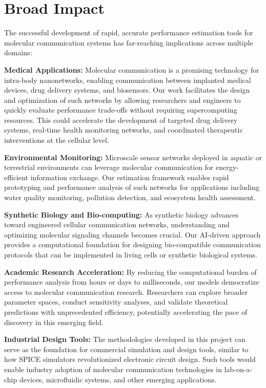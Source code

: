 \documentclass[a4paper,12pt]{report}
\begin{document}
\section{Broad Impact}

The successful development of rapid, accurate performance estimation tools for molecular communication systems has far-reaching implications across multiple domains:

\textbf{Medical Applications:} Molecular communication is a promising technology for intra-body nanonetworks, enabling communication between implanted medical devices, drug delivery systems, and biosensors. Our work facilitates the design and optimization of such networks by allowing researchers and engineers to quickly evaluate performance trade-offs without requiring supercomputing resources. This could accelerate the development of targeted drug delivery systems, real-time health monitoring networks, and coordinated therapeutic interventions at the cellular level.

\textbf{Environmental Monitoring:} Microscale sensor networks deployed in aquatic or terrestrial environments can leverage molecular communication for energy-efficient information exchange. Our estimation framework enables rapid prototyping and performance analysis of such networks for applications including water quality monitoring, pollution detection, and ecosystem health assessment.

\textbf{Synthetic Biology and Bio-computing:} As synthetic biology advances toward engineered cellular communication networks, understanding and optimizing molecular signaling channels becomes crucial. Our AI-driven approach provides a computational foundation for designing bio-compatible communication protocols that can be implemented in living cells or synthetic biological systems.

\textbf{Academic Research Acceleration:} By reducing the computational burden of performance analysis from hours or days to milliseconds, our models democratize access to molecular communication research. Researchers can explore broader parameter spaces, conduct sensitivity analyses, and validate theoretical predictions with unprecedented efficiency, potentially accelerating the pace of discovery in this emerging field.

\textbf{Industrial Design Tools:} The methodologies developed in this project can serve as the foundation for commercial simulation and design tools, similar to how SPICE simulators revolutionized electronic circuit design. Such tools would enable industry adoption of molecular communication technologies in lab-on-a-chip devices, microfluidic systems, and other emerging applications.
\end{document}
